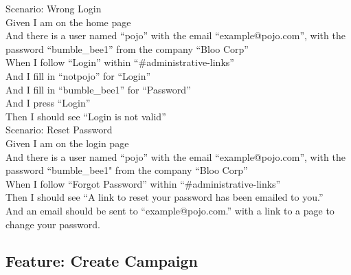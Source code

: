 \documentclass[12pt]{article}
\begin{document}
\begin{hangparas}{0.25in}{1}
Scenario: Wrong Login \\
  Given I am on the home page \\
  And there is a user named ``pojo'' with the email ``example@pojo.com'', with the password ``bumble\_bee1'' from the company ``Bloo Corp'' \\
  When I follow ``Login'' within ``\#administrative-links'' \\
  And I fill in ``notpojo'' for ``Login'' \\
  And I fill in ``bumble\_bee1'' for ``Password'' \\
  And I press ``Login'' \\
  Then I should see ``Login is not valid'' \\

Scenario: Reset Password \\
  Given I am on the login page \\
  And there is a user named ``pojo'' with the email ``example@pojo.com'', with the password ``bumble\_bee1" from the company ``Bloo Corp'' \\
  When I follow ``Forgot Password'' within ``\#administrative-links'' \\
  Then I should see ``A link to reset your password has been emailed to you.'' \\
  And an email should be sent to ``example@pojo.com.'' with a link to a page to change your password. \\
\end{hangparas}

\subsection{Feature: Create Campaign}
\end{document}
